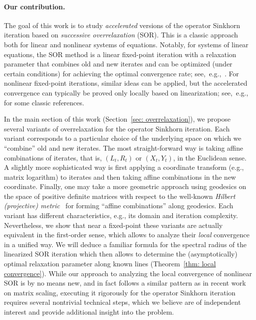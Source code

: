 \documentclass[a4paper]{article}
\theoremstyle{definition}
\numberwithin{equation}{section}
\begin{document}
\paragraph*{Our contribution.}
The goal of this work is to study \emph{accelerated} versions of the operator Sinkhorn iteration based on \emph{successive overrelaxation} (SOR). This is a classic approach both for linear and nonlinear systems of equations. Notably, for systems of linear equations, the SOR method is a linear fixed-point iteration with a relaxation parameter that combines old and new iterates and can be optimized (under certain conditions) for achieving the optimal convergence rate; see,~e.g.,~\cite[Chapters~3 and~4]{Hackbusch2016}. For nonlinear fixed-point iterations, similar ideas can be applied, but the accelerated convergence can typically be proved only locally based on linearization; see,~e.g.,~\cite{Schechter1962,Ortega1970,Hageman1975} for some classic references.

In the main section of this work (Section~\ref{sec: overrelaxation}), we propose several variants of overrelaxation for the operator Sinkhorn iteration. Each variant corresponds to a particular choice of the underlying space on which we ``combine'' old and new iterates. The most straight-forward way is taking affine combinations of iterates, that is, $(L_t, R_t)$ or $(X_t, Y_t)$, in the Euclidean sense. A slightly more sophisticated way is first applying a coordinate transform (e.g., matrix logarithm) to iterates and then taking affine combinations in the new coordinate. Finally, one may take a more geometric approach using geodesics on the space of positive definite matrices with respect to the well-known \emph{Hilbert (projective) metric}~\cite{Lemmens2012} for forming ``affine combinations'' along geodesics. Each variant has different characteristics, e.g., its domain and iteration complexity. Nevertheless, we show that near a fixed-point these variants are actually equivalent in the first-order sense, which allows to analyze their \emph{local} convergence in a unified way. We will deduce a familiar formula for the spectral radius of the linearized SOR iteration which then allows to determine the (asymptotically) optimal relaxation parameter along known lines (Theorem~\ref{thm: local convergence}). While our approach to analyzing the local convergence of nonlinear SOR is by no means new, and in fact follows a similar pattern as in recent work~\cite{Thibault2021,Lehmann2022} on matrix scaling, executing it rigorously for the operator Sinkhorn iteration requires several nontrivial technical steps, which we believe are of independent interest and provide additional insight into the problem.
\end{document}
